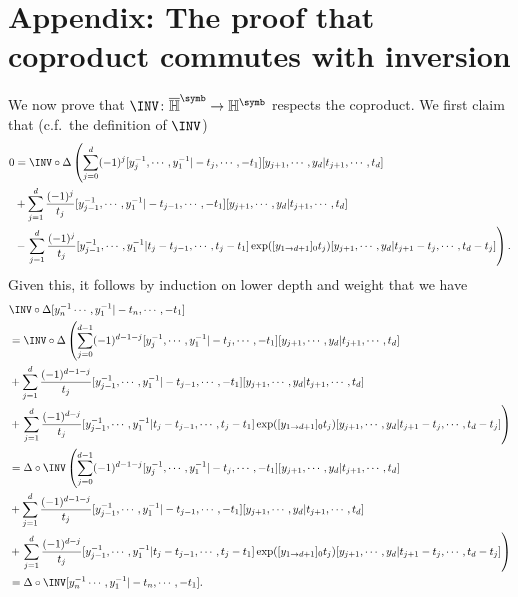 \section{Appendix: The proof that coproduct commutes with inversion}\label{sec:DeltaCommutesWithINV}
We now prove that $\INV\colon\overline{\mathbb H}^{\symb}\to\mathbb H^{\symb}$ respects the coproduct. We first claim that (c.f.~the definition of $\INV$)
\begin{equation}\label{eq:Claim}
\begin{aligned}
0&=\INV\circ\Delta\left(\sum_{j=0}^d(-1)^j[y_j^{-1},\cdots,y_1^{-1}|-t_j,\cdots,-t_1][y_{j+1},\cdots,y_d|t_{j+1},\cdots,t_d]\right.\\
&+\sum_{j=1}^d\frac{(-1)^j}{t_j}[y_{j-1}^{-1},\cdots,y_1^{-1}|-t_{j-1},\cdots,-t_1][y_{j+1},\cdots,y_d|t_{j+1},\cdots,t_d]\\
&-\left.\sum_{j=1}^d\frac{(-1)^{j}}{t_j}[y_{j-1}^{-1},\cdots,y_1^{-1}|t_j-t_{j-1},\cdots,t_j-t_1]\exp([y_{1\to d+1}]_0t_j)[y_{j+1},\cdots,y_d|t_{j+1}-t_{j},\cdots,t_d-t_j]\right).
\end{aligned}
\end{equation}
Given this, it follows by induction on lower depth and weight that we have
\begin{align*}
&\INV\circ\Delta[y_n^{-1}\cdots,y_1^{-1}|-t_n,\cdots,-t_1]\\
&=\INV\circ\Delta\left(\sum_{j=0}^{d-1}(-1)^{d-1-j}[y_j^{-1},\cdots,y_1^{-1}|-t_j,\cdots,-t_1][y_{j+1},\cdots,y_d|t_{j+1},\cdots,t_d]\right.\\
&+\sum_{j=1}^d\frac{(-1)^{d-1-j}}{t_j}[y_{j-1}^{-1},\cdots,y_1^{-1}|-t_{j-1},\cdots,-t_1][y_{j+1},\cdots,y_d|t_{j+1},\cdots,t_d]\\
&+\left.\sum_{j=1}^d\frac{(-1)^{d-j}}{t_j}[y_{j-1}^{-1},\cdots,y_1^{-1}|t_j-t_{j-1},\cdots,t_j-t_1]\exp([y_{1\to d+1}]_0t_j)[y_{j+1},\cdots,y_d|t_{j+1}-t_{j},\cdots,t_d-t_j]\right)\\
&=\Delta\circ\INV\left(\sum_{j=0}^{d-1}(-1)^{d-1-j}[y_j^{-1},\cdots,y_1^{-1}|-t_j,\cdots,-t_1][y_{j+1},\cdots,y_d|t_{j+1},\cdots,t_d]\right.\\
&+\sum_{j=1}^d\frac{(-1)^{d-1-j}}{t_j}[y_{j-1}^{-1},\cdots,y_1^{-1}|-t_{j-1},\cdots,-t_1][y_{j+1},\cdots,y_d|t_{j+1},\cdots,t_d]\\
&+\left.\sum_{j=1}^d\frac{(-1)^{d-j}}{t_j}[y_{j-1}^{-1},\cdots,y_1^{-1}|t_j-t_{j-1},\cdots,t_j-t_1]\exp([y_{1\to d+1}]_0t_j)[y_{j+1},\cdots,y_d|t_{j+1}-t_{j},\cdots,t_d-t_j]\right)\\
&=\Delta\circ\INV[y_n^{-1}\cdots,y_1^{-1}|-t_n,\cdots,-t_1].
\end{align*}
